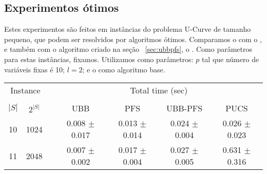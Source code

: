 \subsection{Experimentos ótimos}
Estes experimentos são feitos em instâncias do problema U-Curve de 
tamanho pequeno, que podem ser resolvidos por algoritmos ótimos. 
Comparamos o  com o ,  e
também com o algoritmo criado na seção ~\ref{sec:ubbpfs}, o 
. Como parâmetros para estas instâncias, fixamos. 
Utilizamos como parâmetros: $p$ tal que número de variáveis fixas é 10;
$l = 2$; e o  como algoritmo base.

\begin{table}
\centering
\footnotesize
\begin{tabular}{cc c cccc}
\toprule
\multicolumn{2}{c}{Instance} & \phantom{} & \multicolumn{4}{c}{Total time (sec)} \\
\cline{1-2}\cline{4-7}\\
$|S|$ & $2^{|S|}$ && UBB & PFS & UBB-PFS & PUCS \\
10 &    1024 &&  0.008 $\pm$ 0.017 & 0.013 $\pm$ 0.014 & 0.024 $\pm$ 0.004 & 0.026 $\pm$ 0.023 \\
11 &    2048 &&  0.007 $\pm$ 0.002 & 0.017 $\pm$ 0.004 & 0.027 $\pm$ 0.005 & 0.631 $\pm$ 0.316 \\

\end{tabular}
\end{table}
